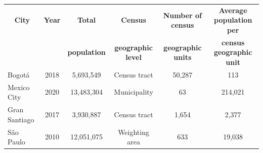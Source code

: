 \begin{tabular}{lccccc}
    \toprule
    \toprule
    \multicolumn{1}{c}{\textbf{City}} & \multicolumn{1}{c}{\textbf{Year}} & \multicolumn{1}{c}{\textbf{Total}} & \multicolumn{1}{c}{\textbf{Census}} & \multicolumn{1}{c}{\textbf{Number of census}} & \multicolumn{1}{c}{\textbf{Average population per}} \\
    & & \multicolumn{1}{c}{\textbf{population}} & \multicolumn{1}{c}{\textbf{geographic level}} & \multicolumn{1}{c}{\textbf{geographic units}} & \multicolumn{1}{c}{\textbf{census geographic unit}} \\
    \midrule
    Bogot\'a & 2018 & 5,693,549 & Census tract & 50,287 & 113 \\
    Mexico City & 2020 & 13,483,304 & Municipality & 63 & 214,021 \\
    Gran Santiago & 2017 & 3,930,887 & Census tract & 1,654 & 2,377 \\
    S\~ao Paulo & 2010 & 12,051,075 & Weighting area & 633 & 19,038 \\
    \bottomrule
    \bottomrule
\end{tabular}
